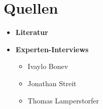\section{Quellen}
\begin{itemize}
	\item 
    	\textbf{Literatur} \\	
        \nocite{*} 
        \printbibliography[heading=none]
	\item 
    	\textbf{Experten-Interviews}\\
		\begin{itemize}
        	\item Ivaylo Bonev
			\item Jonathan Streit
            \item Thomas Lamperstorfer
		\end{itemize}
\end{itemize}
